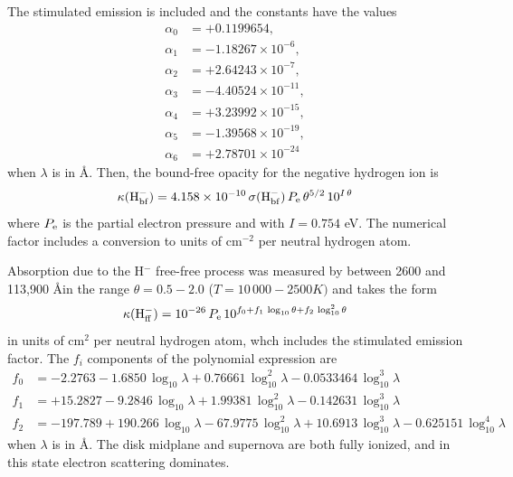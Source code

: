 The stimulated emission is included and the constants have the values
\begin{align}
    \alpha_0 &= +0.1199654, \\
    \alpha_1 &= -1.18267 \times 10^{-6}, \\
    \alpha_2 &= +2.64243 \times 10^{-7}, \\
    \alpha_3 &= -4.40524 \times 10^{-11}, \\
    \alpha_4 &= +3.23992 \times 10^{-15}, \\
    \alpha_5 &= -1.39568 \times 10^{-19}, \\
    \alpha_6 &= +2.78701 \times 10^{-24}
\end{align}
when $\lambda$ is in \AA.
Then, the bound-free opacity for the negative hydrogen ion is
\begin{equation}
    \kappa({\rm H^-_{bf}}) = 4.158 \times 10^{-10} \, \sigma({\rm H^-_{bf}}) \, P_{\rm e} \, \theta^{5/2} \, 10^{I\, \theta} \\
\end{equation}
where $P_{\rm e}$ is the partial electron pressure and with $I = 0.754$ eV.
The numerical factor includes a conversion to units of cm$^{-2}$ per neutral hydrogen atom.

Absorption due to the H$^{-}$ free-free process was measured by \citet{BellBerrington87} between 2600 and 113,900 \AA in the range $\theta = 0.5 - 2.0$ ($T = 10\,000 - 2500 K)$ and takes the form
\begin{equation}
    \kappa({\rm H_{ff}^-}) = 10^{-26} \, P_{\rm e} \, 10^{f_0 + f_1 \, \log_{10} \theta + f_2 \, \log_{10}^2 \theta}
\end{equation}
in units of cm$^2$ per neutral hydrogen atom, whch includes the stimulated emission factor. The $f_i$ components of the polynomial expression are
\begin{align}
    f_0 &= -2.2763 - 1.6850 \, \log_{10} \lambda + 0.76661 \, \log_{10}^2 \lambda - 0.0533464 \, \log_{10}^3 \lambda \\
    f_1 &= +15.2827 - 9.2846 \, \log_{10} \lambda + 1.99381 \, \log_{10}^2 \lambda - 0.142631 \, \log_{10}^3 \lambda \\
    f_2 &= -197.789 + 190.266 \, \log_{10} \lambda - 67.9775 \, \log_{10}^2 \lambda + 10.6913 \, \log_{10}^3 \lambda - 0.625151 \, \log_{10}^4 \lambda
\end{align}
when $\lambda$ is in \AA. The disk midplane and supernova are both fully ionized, and in this state electron scattering dominates.

